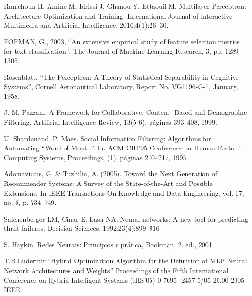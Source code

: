 \documentclass[conference]{IEEEtran}
\begin{document}
\begin{thebibliography}{00}
 Ramchoun H, Amine M, Idrissi J, Ghanou Y, Ettaouil M. Multilayer Perceptron: Architecture Optimization and Training. International Journal of Interactive Multimedia and Artificial Intelligence. 2016;4(1):26–30.

FORMAN, G., 2003, “An extensive empirical study of feature selection metrics for
text classification”, The Journal of Machine Learning Research, 3, pp. 1289–
1305.

 Rosenblatt, “The Perceptron: A Theory of Statistical Separability in Cognitive Systems”, Cornell Aeronautical Laboratory, Report No. VG1196-G-1, January, 1958. 

 J. M. Pazzani. A Framework for Collaborative, Content- Based and Demographic Filtering. Artificial Intelligence Review, 13(5-6). páginas 393–408, 1999.

 U. Shardanand, P. Maes. Social Information Filtering: Algorithms for Automating “Word of Mouth”. In: ACM CHI’95 Conference on Human Factor in Computing Systems, Proceedings, (1). páginas 210–217, 1995.

 Adomavicius, G. & Tuzhilin, A. (2005). Toward the Next Generation of Recommender
Systems: A Survey of the State-of-the-Art and Possible Extensions. In IEEE
Transactions On Knowledge and Data Engineering, vol. 17, no. 6, p. 734–749.


 Salchenberger LM, Cinar E, Lash NA. Neural networks: A new tool for predicting thrift failures. Decision Sciences. 1992;23(4):899–916

 S. Haykin, Redes Neurais: Princípios e prática, Bookman, 2. ed., 2001.

 T.B Ludermir “Hybrid Optimization Algorithm for the Definition of MLP Neural Network Architectures and Weights” Proceedings of the Fifth International Conference on Hybrid Intelligent Systems (HIS’05) 0-7695- 2457-5/05 20.00 2005 IEEE.





\end{thebibliography}
\end{document}
